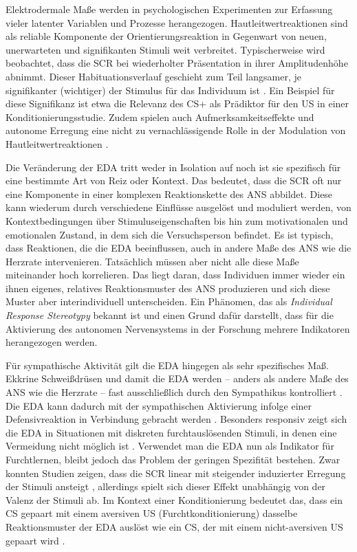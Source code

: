 		Elektrodermale Maße werden in psychologischen Experimenten zur Erfassung vieler latenter Variablen und Prozesse herangezogen. Hautleitwertreaktionen sind als reliable Komponente der Orientierungsreaktion in Gegenwart von neuen, unerwarteten und signifikanten Stimuli \parencite{SIDDLE1991} weit verbreitet. Typischerweise wird beobachtet, dass die SCR bei wiederholter Präsentation in ihrer Amplitudenhöhe abnimmt. Dieser Habituationsverlauf geschieht zum Teil langsamer, je signifikanter (wichtiger) der Stimulus für das Individuum ist \parencite{BOUCSEIN2012}. Ein Beispiel für diese Signifikanz ist etwa die Relevanz des CS+ als Prädiktor für den US in einer Konditionierungsstudie. Zudem spielen auch Aufmerksamkeitseffekte und autonome Erregung eine nicht zu vernachlässigende Rolle in der Modulation von Hautleitwertreaktionen \parencite[für eine Ausführung siehe][]{DAWSON2007b}.
		
		Die Veränderung der EDA tritt weder in Isolation auf noch ist sie spezifisch für eine bestimmte Art von Reiz oder Kontext. Das bedeutet, dass die SCR oft nur eine Komponente in einer komplexen Reaktionskette des ANS abbildet. Diese kann wiederum durch verschiedene Einflüsse ausgelöst und moduliert werden, von Kontextbedingungen über Stimuluseigenschaften bis hin zum motivationalen und emotionalen Zustand, in dem sich die Versuchsperson befindet. Es ist typisch, dass Reaktionen, die die EDA beeinflussen, auch in andere Maße des ANS wie die Herzrate intervenieren. Tatsächlich müssen aber nicht alle diese Maße miteinander hoch korrelieren. Das liegt daran, dass Individuen immer wieder ein ihnen eigenes, relatives Reaktionsmuster des ANS produzieren und sich diese Muster aber interindividuell unterscheiden. Ein Phänomen, das als \textit{Individual Response Stereotypy} bekannt ist \parencite{ENGEL1960} und einen Grund dafür darstellt, dass für die Aktivierung des autonomen Nervensystems in der Forschung mehrere Indikatoren herangezogen werden. 
		
		Für sympathische Aktivität gilt die EDA hingegen als sehr spezifisches Maß. Ekkrine Schweißdrüsen und damit die EDA werden -- anders als andere Maße des ANS wie die Herzrate -- fast ausschließlich durch den Sympathikus kontrolliert \parencite{DAWSON2007b}. Die EDA kann dadurch mit der sympathischen Aktivierung infolge einer Defensivreaktion in Verbindung gebracht werden \parencite{MERZ2020}. Besonders responsiv zeigt sich die EDA in Situationen mit diskreten furchtauslösenden Stimuli, in denen eine Vermeidung nicht möglich ist \parencite{DAWSON2007b}. 
		Verwendet man die EDA nun als Indikator für Furchtlernen, bleibt jedoch das Problem der geringen Spezifität bestehen. Zwar konnten Studien zeigen, dass die SCR linear mit steigender induzierter Erregung der Stimuli ansteigt \parencite{LANG1990}, allerdings spielt sich dieser Effekt unabhängig von der Valenz der Stimuli ab. Im Kontext einer Konditionierung bedeutet das, dass ein CS gepaart mit einem aversiven US (Furchtkonditionierung) dasselbe Reaktionsmuster der EDA auslöst wie ein CS, der mit einem nicht-aversiven US gepaart wird \parencite{HAMM1996}.
		
